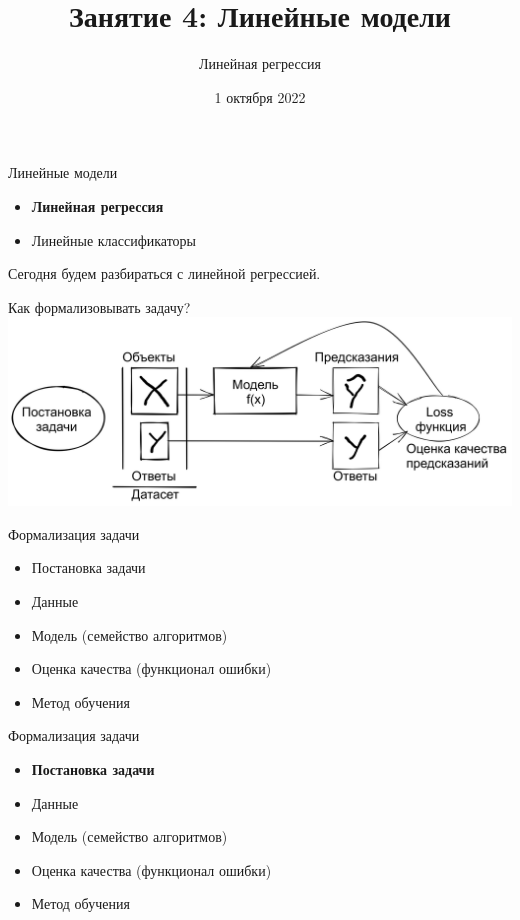\documentclass[aspectratio=169]{beamer}
\title{Занятие 4: Линейные модели}
\subtitle{Линейная регрессия}
\date{1 октября 2022}
\begin{document}
\maketitle

\begin{frame}{Линейные модели}
    \begin{itemize}
        \item \textbf{Линейная регрессия}
        \item Линейные классификаторы
    \end{itemize}

    Сегодня будем разбираться с линейной регрессией.
\end{frame}

\begin{frame}{Как формализовывать задачу?}
    \includegraphics[width=\linewidth]{graphs/fig1.jpg}
\end{frame}

\begin{frame}{Формализация задачи}
    \begin{itemize}
        \item Постановка задачи
        \item Данные
        \item Модель (семейство алгоритмов)
        \item Оценка качества (функционал ошибки)
        \item Метод обучения
    \end{itemize}
\end{frame}

\begin{frame}{Формализация задачи}
    \begin{itemize}
        \item \textbf{Постановка задачи}
        \item Данные
        \item Модель (семейство алгоритмов)
        \item Оценка качества (функционал ошибки)
        \item Метод обучения
    \end{itemize}
\end{frame}
\end{document}
